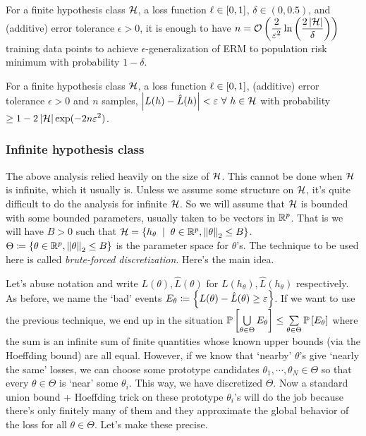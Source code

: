 \begin{cor}\label{cor:n}
For a finite hypothesis class $\cH$, a loss function $\l\in[0,1]$, $\delta\in(0,0.5)$, and (additive) error tolerance $\epsilon>0$, it is enough to have $\ds n=\cO\left(\frac{2}{\epsilon^{2}}\ln\left(\frac{2\abs {\cH}}{\delta}\right)\right)$ training data points to achieve $\epsilon$-generalization of ERM to population risk minimum with probability $1-\delta$. 
\end{cor}

\begin{cor}\label{cor:delta}
For a finite hypothesis class $\cH$, a loss function $\l\in[0,1]$, (additive) error tolerance $\epsilon>0$ and $n$ samples, $\abs{L(h)-\hat L(h)} < \epsilon\fa h\in \cH$ with probability $\ds\ge 1-2\abs{\cH}\exp(-2n\epsilon^{2})$.
\end{cor}

\subsubsection{Infinite hypothesis class}
The above analysis relied heavily on the size of $\cH$. This cannot be done when $\cH$ is infinite, which it usually is. Unless we assume some structure on $\cH$, it's quite difficult to do the analysis for infinite $\cH$. So we will assume that $\cH$ is bounded with some bounded parameters, usually taken to be vectors in $\R^{p}$. That is we will have $B>0$ such that $\cH=\set{h_{\theta} \st \theta\in\R^{p}, \norm{\theta}{2}\le B}$. $\Theta \sett \set{\theta\in\R^{p}, \norm{\theta}{2}\le B}$ is the parameter space for $\theta$'s. The technique to be used here is called \textit{brute-forced discretization}. Here's the main idea.

Let's abuse notation and write $L(\theta),\hat L(\theta)$ for $L(h_{\theta}),\hat L(h_{\theta})$ respectively. As before, we name the `bad' events $E_{\theta} \sett \set{L(\theta) - \hat L(\theta) \ge \epsilon}$. If we want to use the previous technique, we end up in the situation $\P{\bigcup\limits_{\theta\in\Theta}E_{\theta}} \le \sum\limits_{\theta\in\Theta}\P{E_{\theta}}$ where the sum is an infinite sum of finite quantities whose known upper bounds (via the Hoeffding bound) are all equal. However, if we know that `nearby' $\theta$'s give `nearly the same' losses, we can choose some prototype candidates $\theta_{1},\cdots,\theta_{N}\in \Theta$ so that every $\theta\in\Theta$ is `near' some $\theta_{i}$. This way, we have discretized $\Theta$. Now a standard union bound + Hoeffding trick on these prototype $\theta_{i}$'s will do the job because there's only finitely many of them and they approximate the global behavior of the loss for all $\theta\in\Theta$. Let's make these precise.

